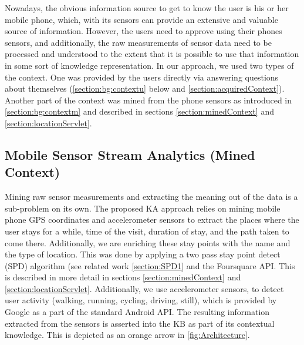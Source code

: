 Nowadays, the obvious information source to get to know the user is his or her
mobile phone, which, with its sensors can provide an extensive and valuable 
source of information. However, the users need to approve using their phones 
sensors, and additionally, the raw measurements of sensor data need to be 
processed and understood to the extent that it is possible to use that 
information in some sort of knowledge representation. In our approach, we used 
two types of the context. One was provided by the users directly via answering 
questions about themselves (\autoref{section:bg:contextu} below and 
\autoref{section:acquiredContext}). Another part 
of the context was mined from the phone sensors as introduced in 
\autoref{section:bg:contextm} and described in sections 
\ref{section:minedContext} and \ref{section:locationServlet}.

\subsection{Mobile Sensor Stream Analytics (Mined Context)} 
\label{section:bg:contextu}
Mining raw sensor measurements and extracting the meaning out of the data is a 
sub-problem on its own. The proposed KA approach relies on mining mobile phone 
GPS coordinates and accelerometer sensors to extract the places where the user 
stays for a while, time of the visit, duration of stay, and the path taken to 
come there. Additionally, we are enriching these stay points with the name and 
the type of location. This was done by applying a two pass stay point detect
(SPD) algorithm (see related work \autoref{section:SPD1} and the Foursquare API. 
This is described in more detail in sections \ref{section:minedContext} and
\ref{section:locationServlet}. Additionally, we use accelerometer sensors, 
to detect user activity (walking, running, cycling, driving, still), which is 
provided by Google as a part of the standard Android API. The resulting 
information extracted from the sensors is asserted into the KB as part of its 
contextual knowledge. This is depicted as an orange arrow in 
\autoref{fig:Architecture}.

